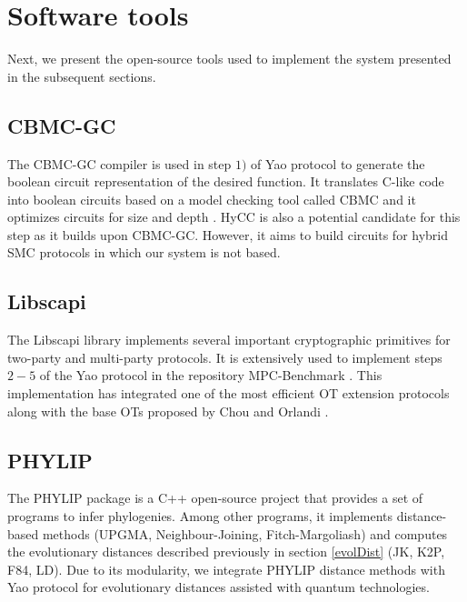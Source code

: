 \section{Software tools} \label{softTools}


Next, we present the open-source tools used to implement the system presented in the subsequent sections.

\subsection{CBMC-GC}

The CBMC-GC compiler \cite{F14} is used in step $1)$ of Yao protocol to generate the boolean circuit representation of the desired function. It translates C-like code into boolean circuits based on a model checking tool called CBMC and it optimizes circuits for size and depth \cite{Bscher2017, Buescher2016}. HyCC \cite{Bscher2018} is also a potential candidate for this step as it builds upon CBMC-GC. However, it aims to build circuits for hybrid SMC protocols in which our system is not based.

\subsection{Libscapi}

The Libscapi library \cite{libscapi} implements several important cryptographic primitives for two-party and multi-party protocols. It is extensively used to implement steps $2-5$ of the Yao protocol in the repository MPC-Benchmark \cite{mpc_benchmark}. This implementation has integrated one of the most efficient OT extension protocols \cite{K15} along with the base OTs proposed by Chou and Orlandi \cite{C15}.

\subsection{PHYLIP}

The PHYLIP package \cite{F89} is a C++ open-source project that provides a set of programs to infer phylogenies. Among other programs, it implements distance-based methods (UPGMA, Neighbour-Joining, Fitch-Margoliash) and computes the evolutionary distances described previously in section \ref{evolDist} (JK, K2P, F84, LD). Due to its modularity, we integrate PHYLIP distance methods with Yao protocol for evolutionary distances assisted with quantum technologies.




